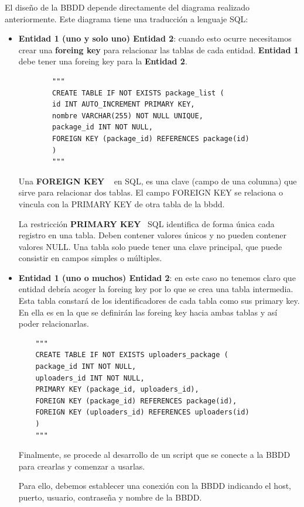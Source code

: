 \documentclass[a4paper, 12pt]{book}
\begin{document}
El diseño de la BBDD depende directamente del diagrama realizado anteriormente. 
Este diagrama tiene una traducción a lenguaje SQL:
\begin{itemize}
	\item \textbf {Entidad 1 (uno y solo uno) Entidad 2}: cuando esto ocurre necesitamos crear una \textbf {foreing key} para relacionar las tablas de cada entidad. \textbf {Entidad 1} debe tener una foreing key para la \textbf {Entidad 2}.
	
	\begin{verbatim}
		"""
		CREATE TABLE IF NOT EXISTS package_list (
		id INT AUTO_INCREMENT PRIMARY KEY,
		nombre VARCHAR(255) NOT NULL UNIQUE,
		package_id INT NOT NULL,
		FOREIGN KEY (package_id) REFERENCES package(id)
		)
		"""
	\end{verbatim}
	
	Una \textbf {FOREIGN KEY} ~\cite{thedataschool:_foreingkey} en SQL, es una clave (campo de una columna) que sirve para relacionar dos tablas. El campo FOREIGN KEY se relaciona o vincula con la PRIMARY KEY de otra tabla de la bbdd.
	
	La restricción \textbf {PRIMARY KEY}~\cite{thedataschool:_primarykey} SQL identifica de forma única cada registro en una tabla.
	Deben contener valores únicos y no pueden contener valores NULL.
	Una tabla solo puede tener una clave principal, que puede consistir en campos simples o múltiples.
	
	\item \textbf {{Entidad 1 (uno o muchos) Entidad 2}}: en este caso no tenemos claro que entidad debría acoger la foreing key por lo que se crea una tabla intermedia.
	Esta tabla constará de los identificadores de cada tabla como sus primary key.
	En ella es en la que se definirán las foreing key hacia ambas tablas y así poder relacionarlas.
	
	\begin{verbatim}
	"""
	CREATE TABLE IF NOT EXISTS uploaders_package (
	package_id INT NOT NULL,
	uploaders_id INT NOT NULL,
	PRIMARY KEY (package_id, uploaders_id),
	FOREIGN KEY (package_id) REFERENCES package(id),
	FOREIGN KEY (uploaders_id) REFERENCES uploaders(id)
	)
	"""
	\end{verbatim}
	
	Finalmente, se procede al desarrollo de un script que se conecte a la BBDD para crearlas y comenzar a usarlas.
	
	Para ello, debemos establecer una conexión con la BBDD indicando el host, puerto, usuario, contraseña y nombre de la BBDD.
	

\end{itemize}
\end{document}
